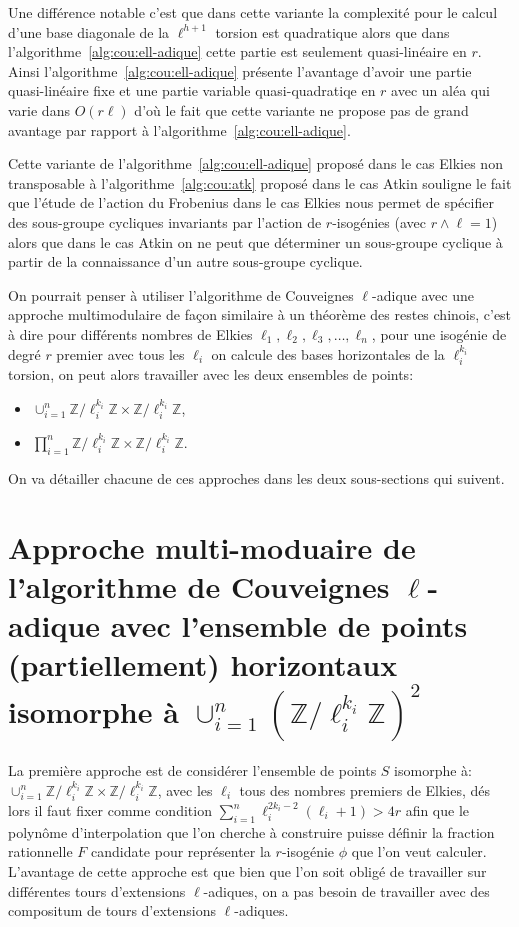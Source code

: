 \documentclass[10pt,a4paper]{book}
\theoremstyle{plain}
\theoremstyle{definition}
\theoremstyle{definition}
\theoremstyle{definition}
\theoremstyle{definition}
\theoremstyle{remark}
\theoremstyle{remark}
\theoremstyle{definition}
\begin{document}
Une différence notable c'est que dans cette variante la complexité pour le 
calcul d'une base diagonale de la $\ell^{h+1}$ torsion est quadratique alors 
que dans l'algorithme~\ref{alg:cou:ell-adique} cette partie est seulement 
quasi-linéaire en $r$.  Ainsi l'algorithme~\ref{alg:cou:ell-adique} présente
l'avantage d'avoir une partie quasi-linéaire fixe et une partie variable 
quasi-quadratiqe en $r$ avec un aléa qui varie dans $O(r\ell)$ d'où le fait que
cette variante ne propose pas de grand avantage par rapport à 
l'algorithme~\ref{alg:cou:ell-adique}.

Cette variante de l'algorithme~\ref{alg:cou:ell-adique}  proposé dans le cas 
Elkies non transposable à l'algorithme~\ref{alg:cou:atk} proposé dans le cas 
Atkin souligne le fait que l'étude de l'action du Frobenius dans le cas Elkies 
nous permet de spécifier des sous-groupe cycliques invariants par l'action de 
$r$-isogénies (avec $r \wedge \ell = 1$) alors que dans le cas Atkin on ne peut
que déterminer un sous-groupe cyclique à partir de la connaissance d'un autre 
sous-groupe cyclique.


On pourrait penser à utiliser l'algorithme de Couveignes $\ell$-adique avec une
approche multimodulaire de façon similaire à un théorème des restes chinois, 
c'est à dire pour différents nombres de Elkies $\ell_1, \ell_2, \ell_3, \dots, 
\ell_{n}$, pour une isogénie de degré $r$ premier avec tous les $\ell_i$ on 
calcule des bases horizontales de la $\ell_i^{k_i}$ torsion, on peut alors 
travailler avec les deux ensembles de points:
\begin{itemize}
\item $\cup_{i=1}^n \mathbb{Z}/\ell_i^{k_i} \mathbb{Z} \times \mathbb{Z}/\ell_i^{k_i} \mathbb{Z}$, 
\item $\prod_{i=1}^n \mathbb{Z}/\ell_i^{k_i} \mathbb{Z} \times \mathbb{Z}/\ell_i^{k_i} \mathbb{Z} $.
\end{itemize}
On va détailler chacune de ces approches dans les deux sous-sections qui suivent.

\section{Approche multi-moduaire de l'algorithme de Couveignes $\ell$-adique avec l'ensemble de points (partiellement) horizontaux isomorphe à $\cup_{i=1}^n \left( \mathbb{Z}/\ell_i^{k_i} \mathbb{Z} \right)^{2}$}
La première approche est de considérer l'ensemble de points $S$ isomorphe à: 
$\cup_{i=1}^n \mathbb{Z}/\ell_i^{k_i} \mathbb{Z} \times \mathbb{Z}/\ell_i^{k_i} \mathbb{Z} $,
avec les $\ell_i$ tous des nombres premiers de Elkies, dés lors il faut fixer comme 
condition  $\sum_{i=1}^n\ell_i^{2k_{i}-2}(\ell_i+1)>4r$
afin que le polynôme d'interpolation que l'on cherche à construire puisse 
définir la fraction rationnelle $F$ candidate pour représenter la $r$-isogénie 
$\phi$ que l'on veut calculer. 
L'avantage de cette approche est que bien que l'on soit obligé de travailler
sur différentes tours d'extensions $\ell$-adiques, on a pas besoin de 
travailler avec des compositum de tours d'extensions $\ell$-adiques.
\end{document}
